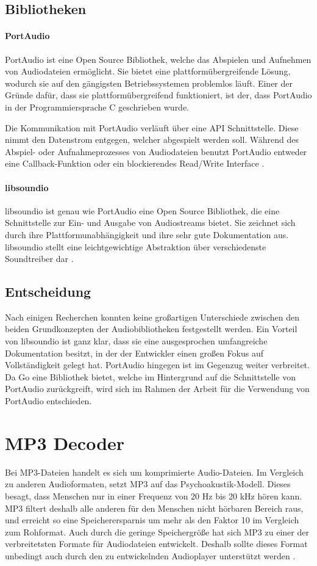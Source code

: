\subsection{Bibliotheken}
\paragraph{PortAudio}
PortAudio ist eine Open Source Bibliothek, welche das Abspielen und Aufnehmen
von Audiodateien ermöglicht. Sie bietet eine plattformübergreifende Lösung,
wodurch sie auf den gängigsten Betriebssystemen problemlos läuft. Einer der
Gründe dafür, dass sie plattformübergreifend funktioniert, ist der, dass
PortAudio in der Programmiersprache C geschrieben wurde. \hfill

Die Kommunikation mit PortAudio verläuft über eine \ac{API} Schnittstelle.
Diese nimmt den Datenstrom entgegen, welcher abgespielt werden soll. Während
des Abspiel- oder Aufnahmeprozesses von Audiodateien benutzt PortAudio entweder
eine Callback-Funktion oder ein blockierendes Read/Write Interface
\autocite{PortAudio_2019}.

\paragraph{libsoundio}
libsoundio ist genau wie PortAudio eine Open Source Bibliothek, die eine
Schnittstelle zur Ein- und Ausgabe von Audiostreams bietet. Sie zeichnet
sich durch ihre Plattformunabhängigkeit und ihre sehr gute Dokumentation aus.
libsoundio stellt eine leichtgewichtige Abstraktion über verschiedenste
Soundtreiber dar \autocite{libsoundio_2019}.

\subsection{Entscheidung}
Nach einigen Recherchen konnten keine großartigen Unterschiede zwischen den
beiden Grundkonzepten der Audiobibliotheken festgestellt werden. Ein Vorteil von
libsoundio ist ganz klar, dass sie eine ausgesprochen umfangreiche
Dokumentation besitzt, in der der Entwickler einen großen Fokus auf
Vollständigkeit gelegt hat. PortAudio hingegen ist im Gegenzug weiter verbreitet.
Da Go eine Bibliothek bietet, welche im Hintergrund auf die Schnittstelle
von PortAudio zurückgreift, wird sich im Rahmen der Arbeit für die
Verwendung von PortAudio entschieden.

\section{MP3 Decoder}
Bei \ac{MP3}-Dateien handelt es sich um komprimierte Audio-Dateien. Im
Vergleich zu anderen Audioformaten, setzt \ac{MP3} auf das
Psychoakustik-Modell. Dieses besagt, dass Menschen nur in einer Frequenz von 20
Hz bis 20 kHz hören kann. \ac{MP3} filtert deshalb alle anderen für den
Menschen nicht hörbaren Bereich raus, und erreicht so eine Speicherersparnis um
mehr als den Faktor 10 im Vergleich zum Rohformat. Auch durch die geringe
Speichergröße hat sich \ac{MP3} zu einer der verbreitetsten Formate für
Audiodateien entwickelt.  Deshalb sollte dieses Format unbedingt auch durch den
zu entwickelnden Audioplayer unterstützt werden \autocite{mp3}. \hfill

